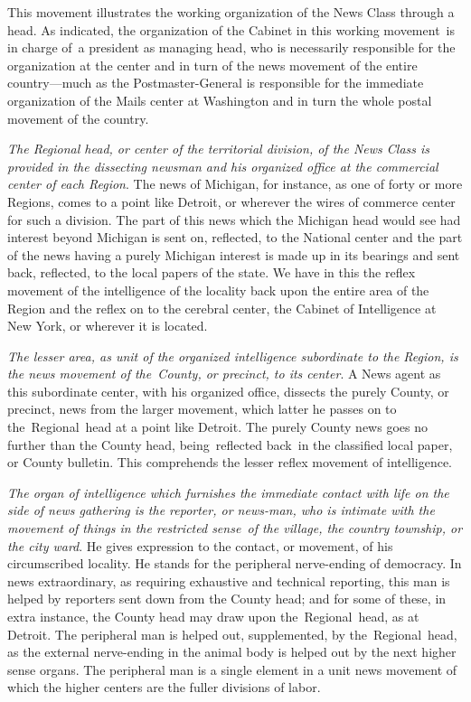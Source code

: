 \documentclass[twoside,symmetric,nobib,justified]{tufte-book}
\begin{document}
This movement illustrates the working organization of the News Class
through a head. As indicated, the organization of the Cabinet in this
working movement~is in charge of~a president as managing head, who is
necessarily responsible for the organization at the center and in turn
of the news movement of the entire country---much as the
Postmaster-General is responsible for the immediate organization of the
Mails center at Washington and in turn the whole postal movement of the
country.~

\vspace{0.05in}

\emph{The Regional head, or center of the territorial division, of the
News Class is provided in the dissecting newsman and his organized
office at the commercial center of each Region}. The news of Michigan,
for instance, as one of forty or more Regions, comes to a point like
Detroit, or wherever the wires of commerce center for such a division.
The part of this news which the Michigan head would see had interest
beyond Michigan is sent on, reflected, to the National center and the
part of the news having a purely Michigan interest is made up in its
bearings and sent back, reflected, to the local papers of the state. We
have in this the reflex movement of the intelligence of the locality
back upon the entire area of the Region and the reflex on to the
cerebral center, the Cabinet of Intelligence at New York, or wherever it
is located.~

\vspace{0.05in}

\emph{The lesser area, as unit of the organized intelligence subordinate
to the Region, is the news movement of the~County, or precinct, to its
center}. A News agent as this subordinate center, with his organized
office, dissects the purely County, or precinct, news from the larger
movement, which latter he passes on to the~Regional~head at a point like
Detroit. The purely County news goes no further than the County head,
being~reflected back~in the classified local paper, or County bulletin.
This comprehends the lesser reflex movement of intelligence.~

\vspace{0.05in}

\emph{The organ of intelligence which furnishes the immediate contact
with life on the side of news gathering is the reporter, or news-man,
who is intimate with the movement of things in the restricted sense~of
the village, the country township, or the city ward}. He gives
expression to the contact, or movement, of his circumscribed locality.
He stands for the peripheral nerve-ending of democracy. In news
extraordinary, as requiring exhaustive and technical reporting, this man
is helped by reporters sent down from the County head; and for some of
these, in extra instance, the County head may draw upon
the~Regional~head, as at Detroit. The peripheral man is helped out,
supplemented, by the~Regional~head, as the external nerve-ending in the
animal body is helped out by the next higher sense organs. The
peripheral man is a single element in a unit news movement of which the
higher centers are the fuller divisions of labor.~
\end{document}
